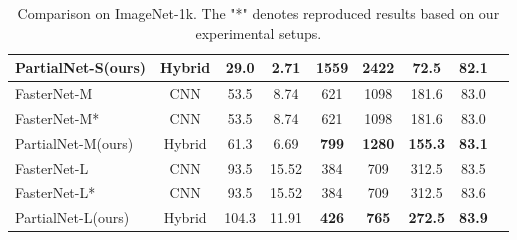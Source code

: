 \begin{table*}[ht]
{\begin{tabular}{@{}lcccccccc@{}}
    PartialNet-S(ours)                  & Hybrid          & 29.0             & 2.71  & {\bf 1559} & {\bf 2422}  & {\bf 72.5}  & {\bf 82.1} \\
    \hline
    FasterNet-M\cite{Chen2023}          & CNN             & 53.5             & 8.74  & 621        & 1098        & 181.6       & 83.0       \\
    FasterNet-M*\cite{Chen2023}         & CNN             & 53.5             & 8.74  & 621        & 1098        & 181.6       & 83.0       \\
    PartialNet-M(ours)                  & Hybrid          & 61.3             & 6.69  & {\bf 799}  & {\bf 1280}  & {\bf 155.3} & {\bf 83.1} \\
    \hline
    FasterNet-L\cite{Chen2023}          & CNN             & 93.5             & 15.52 & 384        & 709         & 312.5       & 83.5       \\
    FasterNet-L*\cite{Chen2023}         & CNN             & 93.5             & 15.52 & 384        & 709         & 312.5       & 83.6       \\
    PartialNet-L(ours)                  & Hybrid          & 104.3            & 11.91 & {\bf 426}  & {\bf 765}   & {\bf 272.5} & {\bf 83.9} \\
    \bottomrule
  \end{tabular}
  }
  \caption{Comparison on ImageNet-1k. The "*" denotes reproduced results based on our experimental setups.}
  \label{tab:pat_vs_fasternet}
\end{table*}
